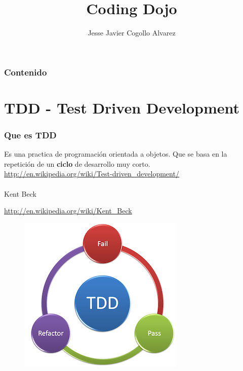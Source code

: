 \documentclass{beamer}
\title[CodingDojo]{Coding Dojo} %
\author{Jesse Javier Cogollo Alvarez} %
\institute[EAFIT] %
{
Developer by passion \\ %
\medskip
\textit{email: cogollo87@gmail.com} \\~\\
\textit{Agile Open Space Popay\'an}
}
\begin{document}
\begin{frame}
\titlepage %
\end{frame}

\begin{frame}
\frametitle{Contenido} %
\tableofcontents %
\end{frame}


\section{TDD - Test Driven Development} %
\begin{frame}
\frametitle{Que es TDD}
Es una practica de programaci\'on orientada a objetos. Que se basa en la repetici\'on 
de un \textbf{ciclo} de desarrollo muy corto.
{\color{blue}\url{http://en.wikipedia.org/wiki/Test-driven_development/}}
\\~\\
Kent Beck

{\color{blue}\url{http://en.wikipedia.org/wiki/Kent_Beck}}

\begin{figure}
\includegraphics[width=0.3\linewidth]{tdd.png}
\end{figure}
\end{frame}
\end{document}
